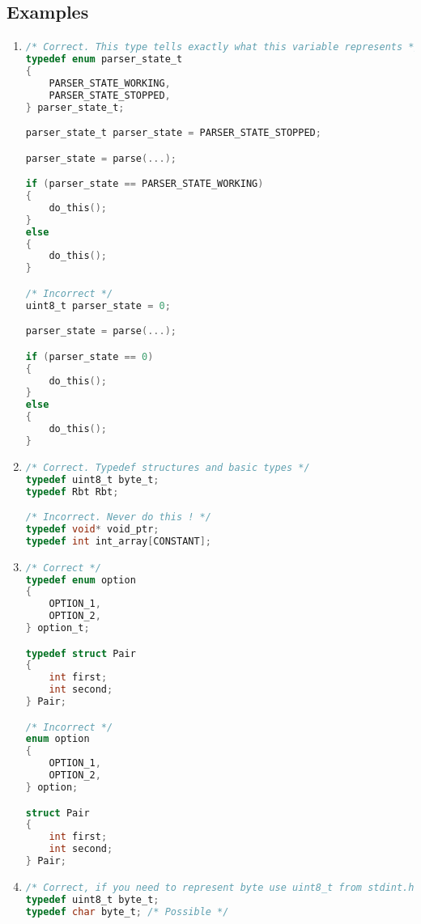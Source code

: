 \subsection{Examples}
\begin{enumerate}
    \item 
\begin{lstlisting}[language=C,style=C99]
/* Correct. This type tells exactly what this variable represents */
typedef enum parser_state_t
{
    PARSER_STATE_WORKING,
    PARSER_STATE_STOPPED,
} parser_state_t;

parser_state_t parser_state = PARSER_STATE_STOPPED;

parser_state = parse(...);

if (parser_state == PARSER_STATE_WORKING)
{
    do_this();
}
else
{
    do_this();
}

/* Incorrect */
uint8_t parser_state = 0;

parser_state = parse(...);

if (parser_state == 0)
{
    do_this();
}
else
{
    do_this();
}
\end{lstlisting}     
    
    \item 
\begin{lstlisting}[language=C,style=C99]
/* Correct. Typedef structures and basic types */
typedef uint8_t byte_t;
typedef Rbt Rbt;

/* Incorrect. Never do this ! */
typedef void* void_ptr;
typedef int int_array[CONSTANT];
\end{lstlisting}    
    
    \item 
\begin{lstlisting}[language=C,style=C99]
/* Correct */
typedef enum option
{
    OPTION_1,
    OPTION_2,
} option_t;

typedef struct Pair
{
    int first;
    int second;
} Pair;

/* Incorrect */
enum option
{
    OPTION_1,
    OPTION_2,
} option;

struct Pair
{
    int first;
    int second;
} Pair;

\end{lstlisting}    

    \item 
\begin{lstlisting}[language=C,style=C99]
/* Correct, if you need to represent byte use uint8_t from stdint.h */
typedef uint8_t byte_t;
typedef char byte_t; /* Possible */


\end{lstlisting}
\end{enumerate}
